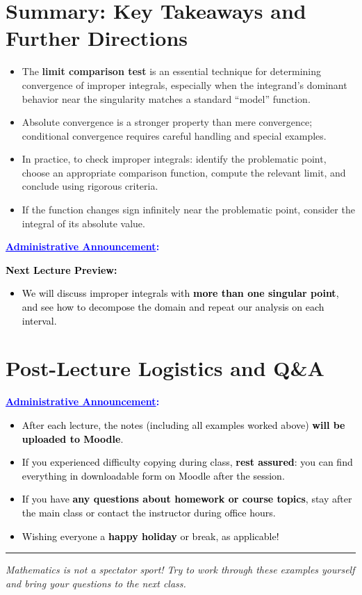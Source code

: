 \documentclass[12pt]{article}
\theoremstyle{definition}
\theoremstyle{plain}
\theoremstyle{remark}
\newenvironment{announcement}
  {\par\medskip\begin{center}\begin{Sbox}\begin{minipage}{0.92\textwidth}\small\bfseries\noindent\textcolor{blue}{\underline{Administrative Announcement}:}\par}
  {\end{minipage}\end{Sbox}\fbox{\TheSbox}\end{center}\medskip}
\begin{document}
\section{Summary: Key Takeaways and Further Directions}

\begin{itemize}
    \item The \textbf{limit comparison test} is an essential technique for determining convergence of improper integrals, especially when the integrand’s dominant behavior near the singularity matches a standard ``model'' function.
    \item Absolute convergence is a stronger property than mere convergence; conditional convergence requires careful handling and special examples.
    \item In practice, to check improper integrals: identify the problematic point, choose an appropriate comparison function, compute the relevant limit, and conclude using rigorous criteria.
    \item If the function changes sign infinitely near the problematic point, consider the integral of its absolute value.
\end{itemize}

\begin{announcement}
\textcolor{black}{
\textbf{Next Lecture Preview:}
\begin{itemize}[leftmargin=*]
    \item We will discuss improper integrals with \textbf{more than one singular point}, and see how to decompose the domain and repeat our analysis on each interval.
\end{itemize}
}
\end{announcement}

\section*{Post-Lecture Logistics and Q\&A}

\begin{announcement}
\textcolor{black}{
\begin{itemize}[leftmargin=*]
    \item After each lecture, the notes (including all examples worked above) \textbf{will be uploaded to Moodle}.
    \item If you experienced difficulty copying during class, \textbf{rest assured}: you can find everything in downloadable form on Moodle after the session.
    \item If you have \textbf{any questions about homework or course topics}, stay after the main class or contact the instructor during office hours.
    \item Wishing everyone a \textbf{happy holiday} or break, as applicable!
\end{itemize}
}
\end{announcement}

\vspace{2ex}
\hrule
\vspace{2ex}

\begin{center}
    \textit{Mathematics is not a spectator sport! Try to work through these examples yourself and bring your questions to the next class.}
\end{center}
\end{document}
